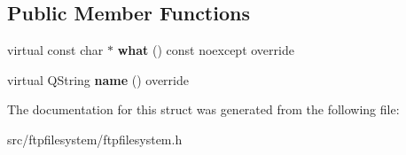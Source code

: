 \subsection*{Public Member Functions}
\begin{DoxyCompactItemize}
\item 
\mbox{\label{structInterfaceFTPfileSystem_1_1WrongRootDirPathException_a1c2c5ee9b9f3888b26b72e8c7f819244}} 
virtual const char $\ast$ {\bfseries what} () const noexcept override
\item 
\mbox{\label{structInterfaceFTPfileSystem_1_1WrongRootDirPathException_a474cd0d12a97ee685a78d0028956de3d}} 
virtual Q\+String {\bfseries name} () override
\end{DoxyCompactItemize}


The documentation for this struct was generated from the following file\+:\begin{DoxyCompactItemize}
\item 
src/ftpfilesystem/ftpfilesystem.\+h\end{DoxyCompactItemize}
